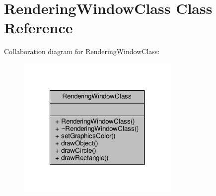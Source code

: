 \hypertarget{classRenderingWindowClass}{\section{Rendering\-Window\-Class Class Reference}
\label{classRenderingWindowClass}
}


Collaboration diagram for Rendering\-Window\-Class\-:\nopagebreak
\begin{figure}[H]
\begin{center}
\leavevmode
\includegraphics[width=222pt]{classRenderingWindowClass__coll__graph}
\end{center}
\end{figure}
